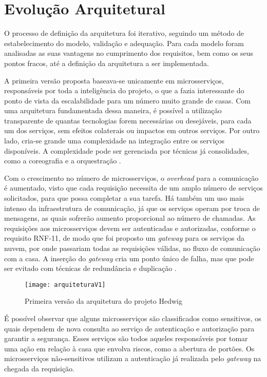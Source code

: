 \section{Evolução Arquitetural}
O processo de definição da arquitetura foi iterativo, seguindo um método de estabelecimento do modelo, validação e adequação. Para cada modelo foram analisadas as suas vantagens no cumprimento dos requisitos, bem como os seus pontos fracos, até a definição da arquitetura a ser implementada.

A primeira versão proposta baseava-se unicamente em microsserviços, responsáveis por toda a inteligência do projeto, o que a fazia interessante do ponto de vista da escalabilidade para um número muito grande de casas. Com uma arquitetura fundamentada dessa maneira, é possível a utilização transparente de quantas tecnologias forem necessárias ou desejáveis, para cada um dos serviços, sem efeitos colaterais ou impactos em outros serviços. Por outro lado, cria-se grande uma complexidade na integração entre os serviços disponíveis. A complexidade pode ser gerenciada por técnicas já consolidades, como a coreografia e a orquestração \cite{lewis}.

Com o crescimento no número de microsserviços, o \emph{overhead} para a comunicação é aumentado, visto que cada requisição necessita de um amplo número de serviços solicitados, para que possa completar a sua tarefa. Há também um uso mais intenso da infraestrutura de comunicação, já que os serviços operam por troca de mensagens, as quais sofrerão aumento proporcional ao número de chamadas. As requisições aos microsserviços devem ser autenticadas e autorizadas, conforme o requisito RNF-11, de modo que foi proposto um \emph{gateway} para os serviços da nuvem, por onde passariam todas as requisições válidas, no fluxo de comunicação com a casa. A inserção do \emph{gateway} cria um ponto único de falha, mas que pode ser evitado com técnicas de redundância e duplicação \cite{oracleSPOF}.

\begin{figure}[H]
	\centering
	\caption{Primeira versão da arquitetura do projeto Hedwig}
  \texttt{[image: arquiteturaV1]}
\label{fig:arquiteturaV1}
\end{figure}

É possível observar que alguns microsserviços são classificados como sensitivos, os quais dependem de nova consulta ao serviço de autenticação e autorização para garantir a segurança. Esses serviços são todos aqueles responsáveis por tomar uma ação em relação à casa que envolva riscos, como a abertura de portões. Os microsserviços não-sensitivos utilizam a autenticação já realizada pelo \textit{gateway} na chegada da requisição.


